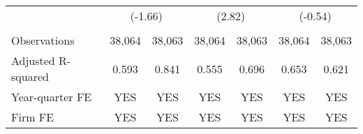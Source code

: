 \begin{table}[htbp]
\begin{tabular}{lcccccc}
    \rowcolor[rgb]{ .933,  .925,  .882}  & \multicolumn{2}{c}{(-1.66)} & \multicolumn{2}{c}{ (2.82)} & \multicolumn{2}{c}{(-0.54)} \\
    &   &   &   &   &   &  \\
    Observations & 38,064 & 38,063 & 38,064 & 38,063 & 38,064 & 38,063 \\
    Adjusted R-squared & 0.593 & 0.841 & 0.555 & 0.696 & 0.653 & 0.621 \\
    Year-quarter FE & YES & YES & YES & YES & YES & YES \\
    Firm FE & YES & YES & YES & YES & YES & YES \\
    \bottomrule
    \bottomrule
    \end{tabular}%
\end{table}%

